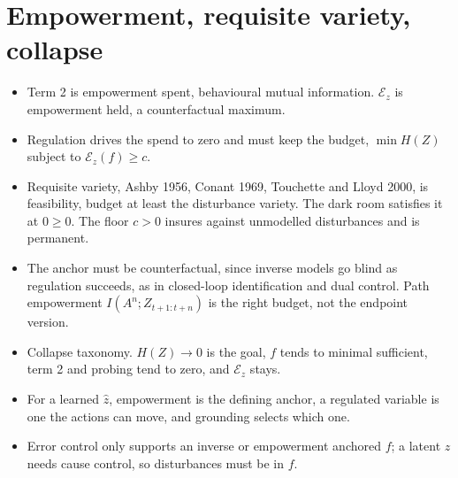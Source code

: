 \documentclass[10pt]{article}
\begin{document}
\section{Empowerment, requisite variety, collapse}
\begin{itemize}
  \item Term 2 is empowerment spent, behavioural mutual information.
    $\mathcal E_z$ is empowerment held, a counterfactual maximum.
  \item Regulation drives the spend to zero and must keep the budget, $\min H(Z)$ subject to $\mathcal E_z(f) \ge c$.
  \item Requisite variety, Ashby 1956, Conant 1969, Touchette and Lloyd 2000, is feasibility, budget at least the disturbance variety.
    The dark room satisfies it at $0 \ge 0$.
    The floor $c > 0$ insures against unmodelled disturbances and is permanent.
  \item The anchor must be counterfactual, since inverse models go blind as regulation succeeds, as in closed-loop identification and dual control.
    Path empowerment $I(A^n; Z_{t+1:t+n})$ is the right budget, not the endpoint version.
  \item Collapse taxonomy.
    $H(Z) \to 0$ is the goal, $f$ tends to minimal sufficient, term 2 and probing tend to zero, and $\mathcal E_z$ stays.
  \item For a learned $\hat z$, empowerment is the defining anchor, a regulated variable is one the actions can move, and grounding selects which one.
  \item Error control only supports an inverse or empowerment anchored $f$; a latent $z$ needs cause control, so disturbances must be in $f$.
\end{itemize}
\end{document}
